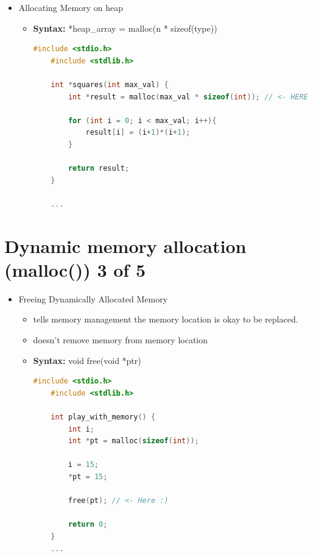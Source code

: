 \documentclass[12pt]{article}
\begin{document}
\bigskip

\begin{itemize}
    \item Allocating Memory on heap
    \begin{itemize}
        \item \textbf{Syntax:} *heap\_array = malloc(n * sizeof(type))

    \begin{lstlisting}[language=c,caption={dynamic\_mem\_example\_2.c}]
    #include <stdio.h>
    #include <stdlib.h>

    int *squares(int max_val) {
        int *result = malloc(max_val * sizeof(int)); // <- HERE :)

        for (int i = 0; i < max_val; i++){
            result[i] = (i+1)*(i+1);
        }

        return result;
    }

    ...
    \end{lstlisting}
    \end{itemize}
\end{itemize}

\bigskip

\section*{Dynamic memory allocation (malloc()) 3 of 5}

\bigskip


\begin{itemize}
    \item Freeing Dynamically Allocated Memory
    \begin{itemize}
        \item tells memory management the memory location is okay to be replaced.
        \item doesn't remove memory from memory location
        \item \textbf{Syntax:} void free(void *ptr)

    \begin{lstlisting}[language=c,caption={dynamic\_mem\_example\_3.c}]
    #include <stdio.h>
    #include <stdlib.h>

    int play_with_memory() {
        int i;
        int *pt = malloc(sizeof(int));

        i = 15;
        *pt = 15;

        free(pt); // <- Here :)

        return 0;
    }
    ...
    \end{lstlisting}
    \end{itemize}
\end{itemize}
\end{document}
